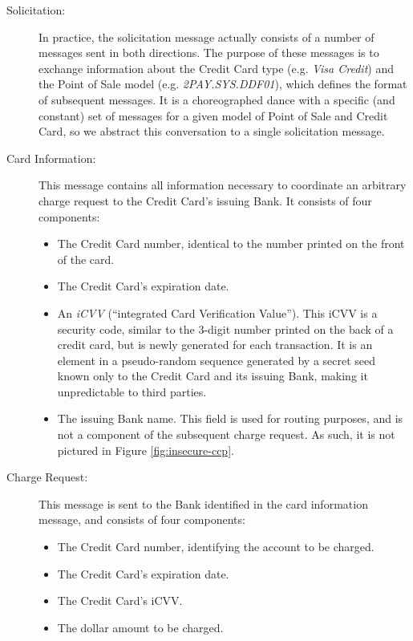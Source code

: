 \begin{description}

\item[Solicitation:]
In practice, the solicitation message actually consists of a number of messages sent in both directions.
The purpose of these messages is to exchange information about the Credit Card type (e.g. \emph{Visa Credit}) and the Point of Sale model (e.g. \emph{2PAY.SYS.DDF01}), which defines the format of subsequent messages.
It is a choreographed dance with a specific (and constant) set of messages for a given model of Point of Sale and Credit Card, so we abstract this conversation to a single solicitation message.

\item[Card Information:]
This message contains all information necessary to coordinate an arbitrary charge request to the Credit Card's issuing Bank. It consists of four components:
\begin{itemize}
	\item The Credit Card number, identical to the number printed on the front of the card.
	\item The Credit Card's expiration date.
	\item An \emph{iCVV} (``integrated Card Verification Value'').
		This iCVV is a security code, similar to the 3-digit number printed on the back of a credit card, but is newly generated for each transaction.
		It is an element in a pseudo-random sequence generated by a secret seed known only to the Credit Card and its issuing Bank, making it unpredictable to third parties.
	\item The issuing Bank name.
		This field is used for routing purposes, and is not a component of the subsequent charge request.
		As such, it is not pictured in Figure \ref{fig:insecure-ccp}.
\end{itemize}

\item[Charge Request:]
This message is sent to the Bank identified in the card information message, and consists of four components:
\begin{itemize}
	\item The Credit Card number, identifying the account to be charged.
	\item The Credit Card's expiration date.
	\item The Credit Card's iCVV.
	\item The dollar amount to be charged.
\end{itemize}


\end{description}

